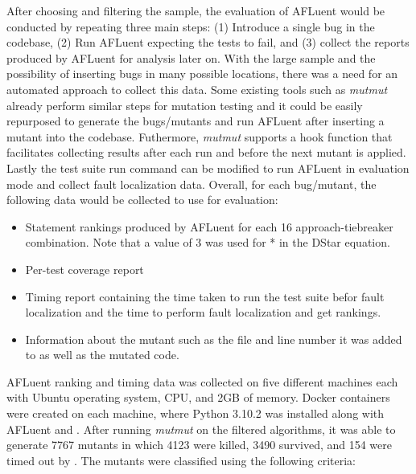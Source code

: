 After choosing and filtering the sample, the evaluation of AFLuent would be
conducted by repeating three main steps: (1) Introduce a single bug in the codebase,
(2) Run AFLuent expecting the tests to fail, and (3) collect the reports
produced by AFLuent for analysis later on. With the large sample and the
possibility of inserting bugs in many possible locations, there was a need for
an automated approach to collect this data. Some existing tools such as
\emph{mutmut}\cite{mutmut} already perform similar steps for
mutation testing and it could be easily repurposed to generate the bugs/mutants and run
AFLuent after inserting a mutant into the codebase. Futhermore, \emph{mutmut}
supports a hook function that facilitates collecting results after each run and
before the next mutant is applied. Lastly the test suite run command can be
modified to run AFLuent in evaluation mode and collect fault localization data.
Overall, for each bug/mutant, the following data would be collected to use for
evaluation:
\begin{itemize}
    \item Statement rankings produced by AFLuent for each 16
    approach-tiebreaker combination. Note that a value of 3 was used for * in
    the DStar equation.
    \item Per-test coverage report
    \item Timing report containing the time taken to run the test suite befor
    fault localization and the time to perform fault localization and get
    rankings.
    \item Information about the mutant such as the file and line number it was
    added to as well as the mutated code.
\end{itemize}

AFLuent ranking and timing data was collected on five different machines each with
Ubuntu operating system,  CPU, and 2GB of memory. Docker containers were created
on each machine, where Python 3.10.2 was installed along with AFLuent and
. After running \emph{mutmut} on the filtered algorithms, it was able
to generate 7767 mutants in which 4123 were killed, 3490 survived, and 154 were
timed out by . The mutants were classified using the following criteria:

